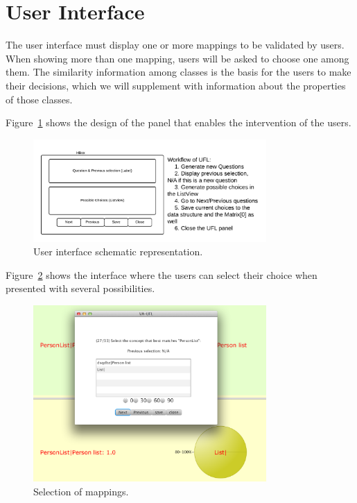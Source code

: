 \section{User Interface}

The user interface must display one or more mappings to be validated
by users. When showing more than one mapping, users will be asked to
choose one among them. The similarity information among classes is the basis for the
users to make their decisions, which we will supplement with
information about the properties of those classes.

Figure~\ref{fig:url_degisn} shows the design of the panel that enables
the intervention of the users.

\begin{figure}[htb]
	\centering
	\includegraphics[width=3.5in]{pics/VA_UFL_Design.png}
	\caption{User interface schematic representation.}
	\label{fig:url_degisn}
\end{figure}

Figure~\ref{fig:ambiguous_selection} shows the interface where the
users can select their choice when presented with several possibilities.


\begin{figure}[htb]
	\centering
	\includegraphics[width=3.5in]{pics/ufl.png}
	\caption{Selection of mappings.}
	\label{fig:ambiguous_selection}
\end{figure}

